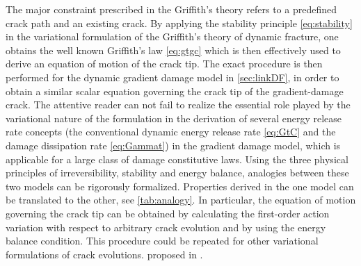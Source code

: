 The major constraint prescribed in the Griffith's theory refers to a predefined crack path and an existing crack. By applying the stability principle \eqref{eq:stability} in the variational formulation of the Griffith's theory of dynamic fracture, one obtains the well known Griffith's law \eqref{eq:gtgc} which is then effectively used to derive an equation of motion of the crack tip. The exact procedure is then performed for the dynamic gradient damage model in \cref{sec:linkDF}, in order to obtain a similar scalar equation governing the crack tip of the gradient-damage crack. The attentive reader can not fail to realize the essential role played by the variational nature of the formulation in the derivation of several energy release rate concepts (the conventional dynamic energy release rate \eqref{eq:GtC} and the damage dissipation rate \eqref{eq:Gammat}) in the gradient damage model, which is applicable for a large class of damage constitutive laws. Using the three physical principles of irreversibility, stability and energy balance, analogies between these two models can be rigorously formalized. Properties derived in the one model can be translated to the other, see \cref{tab:analogy}. In particular, the equation of motion governing the crack tip can be obtained by calculating the first-order action variation with respect to arbitrary crack evolution and by using the energy balance condition. This procedure could be repeated for other variational formulations of crack evolutions.  proposed in \cite{AlessiMarigoVidoli:2015}.
